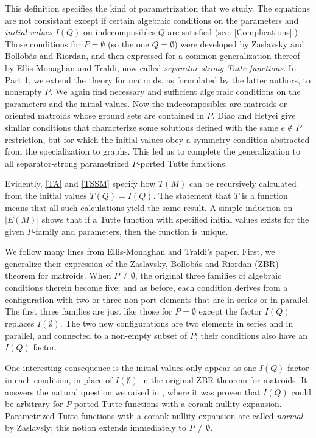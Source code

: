 \documentclass[12pt,leqno]{amsart}
\theoremstyle{remark}
\begin{document}
This definition specifies the kind of 
parametrization that we study.
The equations are not consistant
except if certain algebraic conditions on the parameters
and \emph{initial values} $I(Q)$ on indecomposibles $Q$ 
are satisfied (sec. \ref{Complications}.)  
Those conditions
for $P=\emptyset$ (so the one $Q=\emptyset$)
were developed by Zaslavsky\cite{MR93a:05047} and
Bollob\'{a}s and Riordan\cite{BollobasRiordanTuttePolyColored}, and 
then expressed for
a common generalization thereof by
Ellis-Monaghan and Traldi\cite{Ellis-Monaghan-Traldi}, 
now called \emph{separator-strong Tutte functions}\cite{JoAndTom}.
In Part 1, we extend the theory for matroids,
as formulated by the latter authors,
to nonempty $P$.  
We again find necessary and sufficient
algebraic conditions on the parameters and the initial values.
Now the indecomposibles are
matroids or oriented matroids whose ground sets
are contained in $P$.
Diao and Hetyei \cite{RelTuttePoly} give 
similar conditions that
characterize some 
solutions defined with the same $e\not\in P$ restriction,
but for which the initial
values obey a symmetry condition abstracted from the
specialization to graphs.
This led us to complete the generalization to all
separator-strong parametrized $P$-ported Tutte functions.

Evidently, \eqref{TA} and \eqref{TSSM} 
specify how $T(M)$ can be recursively calculated from
the initial values $T(Q)=I(Q)$.
The statement that $T$ is a function 
means that
all such calculations
yield the same result.
A simple induction on $|E(M)|$
shows that if a Tutte function
with specified initial values 
exists for the given $P$-family and parameters, then the function
is unique.  

We follow many lines from Ellis-Monaghan and Traldi's
paper\cite{Ellis-Monaghan-Traldi}.  First, we generalize
their expression of the 
Zaslavsky, Bollob\'{a}s and Riordan (ZBR) theorem
for matroids.  When $P\neq\emptyset$,
the original three families of algebraic conditions
therein become five;
and as before, each condition
derives from a configuration with two or three
non-port elements that are in series or in parallel.  The
first three families are just like those for $P=\emptyset$
except the factor $I(Q)$ replaces $I(\emptyset)$.
The two new configurations are two elements
in series and in parallel, and connected to a non-empty
subset of $P$; their conditions also have an $I(Q)$
factor.

One interesting consequence is the initial
values 
only appear as one $I(Q)$ factor in each condition,
in place of $I(\emptyset)$ in the original ZBR theorem
for matroids.
It answers the natural
question we raised in \cite{TutteEx}, where 
it was proven that $I(Q)$ could be arbitrary 
for $P$-ported Tutte functions with a corank-nullity
expansion.  Parametrized Tutte functions with a 
corank-nullity expansion are called \emph{normal} by
Zaslavsly\cite{MR93a:05047}; this notion extends immediately
to $P\neq\emptyset$.
\end{document}
